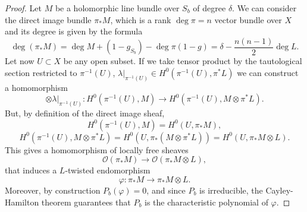 \documentclass[12pt,a4paper]{book}
\theoremstyle{definition} \newtheorem{defn}[thm]{Definition}
\theoremstyle{definition} \newtheorem{ejemplo}[thm]{Example}
\theoremstyle{remark} \newtheorem{rem}[thm]{Remark}
\def\OO{\mathscr{O}}
\begin{document}
	\begin{proof}
	  Let $M$ be a holomorphic line bundle over $S_b$ of degree $\delta$. We can consider the direct image bundle $\pi_*M$, which is a rank $\deg \pi=n$ vector bundle over $X$ and its degree is given by the formula
	  \begin{equation*}
	    \deg(\pi_*M)=\deg M + (1-g_{S_b}) - \deg \pi (1-g)=\delta -  \frac{n(n-1)}{2}\deg L.
	  \end{equation*}
	  Let now $U\subset X$ be any open subset. If we take tensor product by the tautological section restricted to $\pi^{-1}(U)$, $\lambda|_{\pi^{-1}(U)} \in H^0(\pi^{-1}(U),\pi^*L)$ we can construct a homomorphism
	  \begin{equation*}
	    \otimes \lambda|_{\pi^{-1}(U)}: H^0(\pi^{-1}(U),M) \rightarrow H^0(\pi^{-1}(U),M \otimes \pi^*L).
	  \end{equation*}
	  But, by definition of the direct image sheaf,
	  \begin{equation*}
	    H^0(\pi^{-1}(U),M)=H^0(U,\pi_*M),
	  \end{equation*}
	  \begin{equation*}
	    H^0(\pi^{-1}(U),M\otimes \pi^{*}L)=H^0(U,\pi_*(M\otimes \pi^*L))=H^0(U,\pi_*M \otimes L).
	  \end{equation*}
	  This gives a homomorphism of locally free sheaves
	  \begin{equation*}
	      \OO(\pi_*M) \rightarrow \OO(\pi_*M \otimes L),
	  \end{equation*}
	  that induces a $L$-twisted endomorphism
	  \begin{equation*}
	    \varphi:\pi_*M \rightarrow \pi_*M\otimes L.
	  \end{equation*}
	  Moreover, by construction $P_b(\varphi)=0$, and since $P_b$ is irreducible, the Cayley-Hamilton theorem guarantees that $P_b$ is the characteristic polynomial of $\varphi$.


\end{proof}
\end{document}

